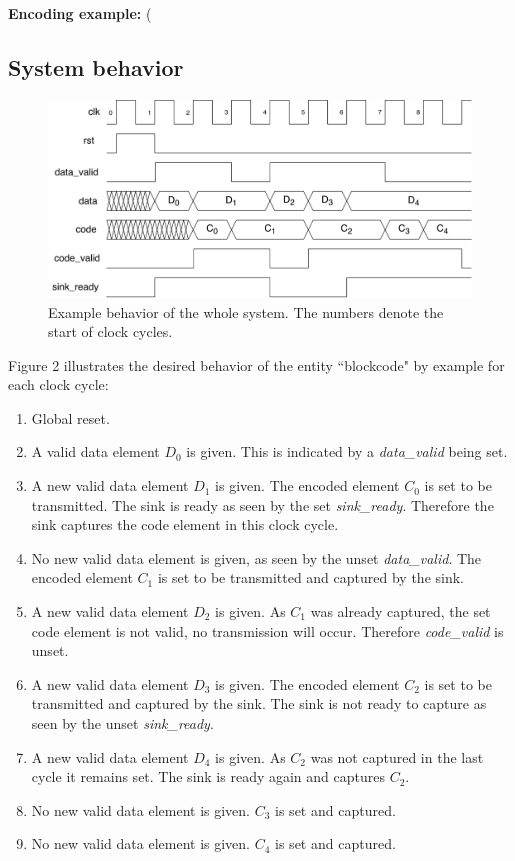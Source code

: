 \documentclass[a4paper,12pt]{article}
\begin{document}
\textbf{Encoding example:} (%

\newpage
\subsection*{\noindent System behavior}

\begin{figure}[h!]
\includegraphics[scale=0.5]{../static/diagram.pdf} 

\caption{Example behavior of the whole system. The numbers denote the start of clock cycles.}
\end{figure}

Figure 2 illustrates the desired behavior of the entity ``blockcode" by example for each clock cycle:
\begin{enumerate}
\item Global reset.
\item A valid data element $D_0$ is given. This is indicated by a \textit{data\_valid} being set.
\item A new valid data element $D_1$ is given. The encoded element $C_0$ is set to be transmitted. The sink is ready as seen by the set \textit{sink\_ready}. Therefore the sink captures the code element in this clock cycle.
\item No new valid data element is given, as seen by the unset \textit{data\_valid}. The encoded element $C_1$ is set to be transmitted and captured by the sink.
\item A new valid data element $D_2$ is given. As $C_1$ was already captured, the set code element is not valid, no transmission will occur. Therefore \textit{code\_valid} is unset.
\item A new valid data element $D_3$ is given. The encoded element $C_2$ is set to be transmitted and captured by the sink. The sink is not ready to capture as seen by the unset \textit{sink\_ready}.
\item A new valid data element $D_4$ is given. As $C_2$ was not captured in the last cycle it remains set. The sink is ready again and captures $C_2$.
\item No new valid data element is given. $C_3$ is set and captured.
\item No new valid data element is given. $C_4$ is set and captured.
\end{enumerate}
\end{document}
